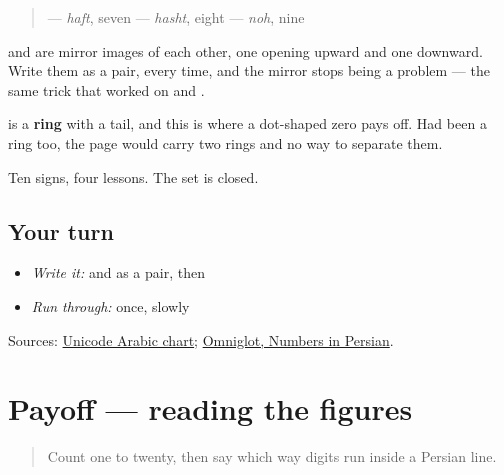 \begin{quote}
\textbf{} — \emph{haft}, seven  \textbf{} — \emph{hasht}, eight  \textbf{} — \emph{noh}, nine
\end{quote}

\textbf{} and \textbf{} are mirror images of each other, one opening upward and one downward. Write them as a pair, every time, and the mirror stops being a problem — the same trick that worked on \textbf{} and \textbf{}.

\textbf{} is a \textbf{ring} with a tail, and this is where a dot-shaped zero pays off. Had \textbf{} been a ring too, the page would carry two rings and no way to separate them.

Ten signs, four lessons. The set is closed.

\subsection*{Your turn}
\begin{itemize}
\raggedright
  \item \emph{Write it:} \textbf{} and \textbf{} as a pair, then \textbf{}
  \item \emph{Run through:} \textbf{         } once, slowly
\end{itemize}

\begin{tcolorbox}[breakable,colback=teal!4,colframe=teal!35!black,title={Before you move on}]
Sources: \href{https://www.unicode.org/charts/PDF/U0600.pdf}{Unicode Arabic chart}; \href{https://www.omniglot.com/language/numbers/persian.htm}{Omniglot, Numbers in Persian}.
\end{tcolorbox}
\section[Practice]{Payoff — reading the figures}

\label{lesson:FA-C19-practice}



\begin{quote}
Count one to twenty, then say which way digits run inside a Persian line.
\end{quote}


